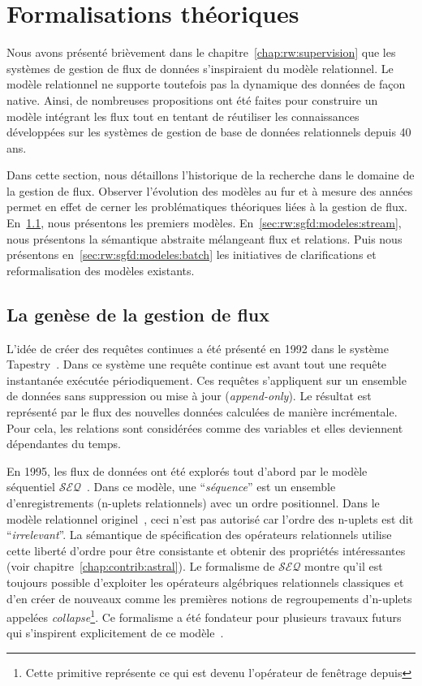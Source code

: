 \section{Formalisations théoriques}\label{sec:rw:sgfd:modeles}
Nous avons présenté brièvement dans le chapitre~\ref{chap:rw:supervision} que les systèmes de gestion de flux de données s'inspiraient du modèle relationnel. Le modèle relationnel ne supporte toutefois pas la dynamique des données de façon native. Ainsi, de nombreuses propositions ont été faites pour construire un modèle intégrant les flux tout en tentant de réutiliser les connaissances développées sur les systèmes de gestion de base de données relationnels depuis 40 ans.

Dans cette section, nous détaillons l'historique de la recherche dans le domaine de la gestion de flux. Observer l'évolution des modèles au fur et à mesure des années permet en effet de cerner les problématiques théoriques liées à la gestion de flux. En~\ref{sec:rw:sgfd:modeles:early}, nous présentons les premiers modèles. En~\ref{sec:rw:sgfd:modeles:stream}, nous présentons la sémantique abstraite mélangeant flux et relations. Puis nous présentons en~\ref{sec:rw:sgfd:modeles:batch} les initiatives de clarifications et reformalisation des modèles existants.

\subsection{La genèse de la gestion de flux}\label{sec:rw:sgfd:modeles:early}
L'idée de créer des requêtes continues a été présenté en 1992 dans le système Tapestry~\cite{Terry:tapestry}. Dans ce système une requête continue est avant tout une requête instantanée exécutée périodiquement. Ces requêtes s'appliquent sur un ensemble de données sans suppression ou mise à jour (\textit{append-only}). Le résultat est représenté par le flux des nouvelles données calculées de manière incrémentale. Pour cela, les relations sont considérées comme des variables et elles deviennent dépendantes du temps.

En 1995, les flux de données ont été explorés tout d'abord par le modèle séquentiel $\mathcal{SEQ}$~\cite{Seshadri:seq}. Dans ce modèle, une \enquote{\it séquence} est un ensemble d'enregistrements (n-uplets relationnels) avec un ordre positionnel. Dans le modèle relationnel originel~\cite{Codd:model}, ceci n'est pas autorisé car l'ordre des n-uplets est dit \enquote{\it irrelevant}. La sémantique de spécification des opérateurs relationnels utilise cette liberté d'ordre pour être consistante et obtenir des propriétés intéressantes (voir chapitre~\ref{chap:contrib:astral}). Le formalisme de $\mathcal{SEQ}$ montre qu'il est toujours possible d'exploiter les opérateurs algébriques relationnels classiques et d'en créer de nouveaux comme les premières notions de regroupements d'n-uplets appelées \textit{collapse}\footnote{Cette primitive représente ce qui est devenu l'opérateur de fenêtrage depuis}. Ce formalisme a été fondateur pour plusieurs travaux futurs qui s'inspirent explicitement de ce modèle~\cite{Gurgen:sstreamware,Babcock:issues}.

